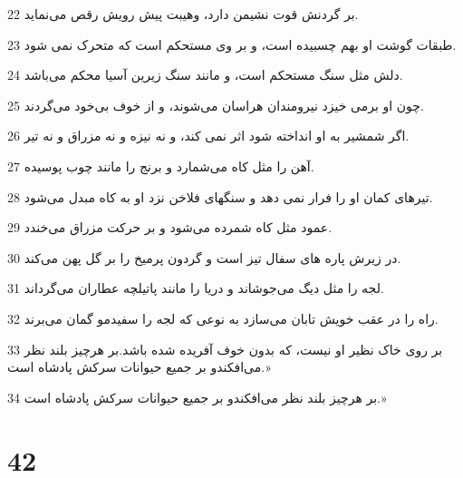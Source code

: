 \par 22 بر گردنش قوت نشیمن دارد، وهیبت پیش رویش رقص می‌نماید.
\par 23 طبقات گوشت او بهم چسبیده است، و بر وی مستحکم است که متحرک نمی شود.
\par 24 دلش مثل سنگ مستحکم است، و مانند سنگ زیرین آسیا محکم می‌باشد.
\par 25 چون او برمی خیزد نیرومندان هراسان می‌شوند، و از خوف بی‌خود می‌گردند.
\par 26 اگر شمشیر به او انداخته شود اثر نمی کند، و نه نیزه و نه مزراق و نه تیر.
\par 27 آهن را مثل کاه می‌شمارد و برنج را مانند چوب پوسیده.
\par 28 تیرهای کمان او را فرار نمی دهد و سنگهای فلاخن نزد او به کاه مبدل می‌شود.
\par 29 عمود مثل کاه شمرده می‌شود و بر حرکت مزراق می‌خندد.
\par 30 در زیرش پاره های سفال تیز است و گردون پرمیخ را بر گل پهن می‌کند.
\par 31 لجه را مثل دیگ می‌جوشاند و دریا را مانند پاتیلچه عطاران می‌گرداند.
\par 32 راه را در عقب خویش تابان می‌سازد به نوعی که لجه را سفیدمو گمان می‌برند.
\par 33 بر روی خاک نظیر او نیست، که بدون خوف آفریده شده باشد.بر هرچیز بلند نظر می‌افکندو بر جمیع حیوانات سرکش پادشاه است.»
\par 34 بر هرچیز بلند نظر می‌افکندو بر جمیع حیوانات سرکش پادشاه است.»
 
\chapter{42}

